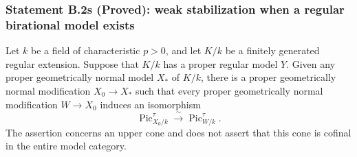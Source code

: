 \subsubsection*{Statement B.2s (Proved): weak stabilization when a regular birational model exists}
\begin{theorem}
\label{B:B2-regular-model-stabilization}
Let $k$ be a field of characteristic $p>0$, and let $K/k$ be a
finitely generated regular extension.  Suppose that $K/k$ has a
proper regular model $Y$.  Given any proper geometrically normal
model $X_*$ of $K/k$, there is a proper geometrically normal
modification $X_0\to X_*$ such that every proper geometrically
normal modification $W\to X_0$ induces an isomorphism
\[
 \operatorname{Pic}^{\tau}_{X_0/k}
       \xrightarrow{\ \sim\ }\operatorname{Pic}^{\tau}_{W/k}.
\]
The assertion concerns an upper cone and does not assert that this
cone is cofinal in the entire model category.
\end{theorem}

